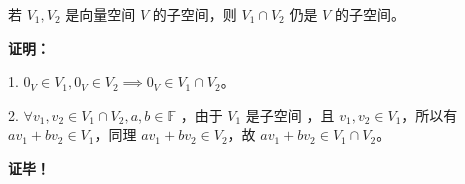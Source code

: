 \begin{theorem}{}\label{the_SubSpc_1}
若 $V_1, V_2$ 是向量空间 $V$ 的子空间，则 $V_1 \cap V_2$ 仍是 $V$ 的子空间。
\end{theorem}
\textbf{证明：}

1. $0_V \in V_1, 0_V \in V_2 \implies 0_V \in V_1 \cap V_2$。

2. $\forall v_1,v_2 \in V_1 \cap V_2, a, b \in \mathbb{F}$ ，由于 $V_1$ 是子空间 ，且 $v_1, v_2 \in V_1$，所以有 $a v_1 + b v_2 \in V_1$，同理 $a v_1 + b v_2 \in V_2$，故 $a v_1 + b v_2 \in V_1 \cap V_2$。

\textbf{证毕！}
